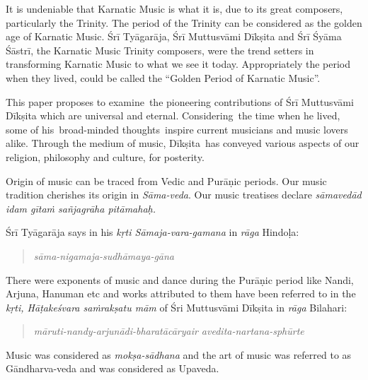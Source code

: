 It is undeniable that Karnatic Music is what it is, due to its great composers, particularly the Trinity. The period of the Trinity can be considered as the golden age of Karnatic Music. Śrī Tyāgarāja, Śrī Muttusvāmi Dīkṣita and Śrī Śyāma Śāstrī, the Karnatic Music Trinity composers, were the trend setters in transforming Karnatic Music to what we see it today. Appropriately the period when they lived, could be called the “Golden Period of Karnatic Music”. 

This paper proposes to examine the pioneering contributions of Śrī Muttusvāmi Dīkṣita which are universal and eternal. Considering the time when he lived, some of his broad-minded thoughts inspire current musicians and music lovers alike. Through the medium of music, Dīkṣita has conveyed various aspects of our religion, philosophy and culture, for posterity. 

Origin of music can be traced from Vedic and Purāṇic periods. Our music tradition cherishes its origin in \textit{Sāma-veda}. Our music treatises declare \textit{sāmavedād idam gītaṁ sañjagrāha pitāmahaḥ.}

Śrī Tyāgarāja says in his \textit{kṛti Sāmaja-vara-gamana} in \textit{rāga} Hindoḷa:

\begin{verse}
\textit{sāma-nigamaja-sudhāmaya-gāna}
\end{verse}

There were exponents of music and dance during the Purāṇic period like Nandi, Arjuna, Hanuman etc and works attributed to them have been referred to in the \textit{kṛti, Hāṭakeśvara saṁrakṣatu mām} of Śri Muttusvāmi Dīkṣita in \textit{rāga} Bilahari:

\begin{verse}
\textit{māruti-nandy-arjunādi-bharatācāryair avedita-nartana-sphūrte}
\end{verse}

Music was considered as \textit{mokṣa-sādhana} and the art of music was referred to as Gāndharva-veda and was considered as Upaveda.

